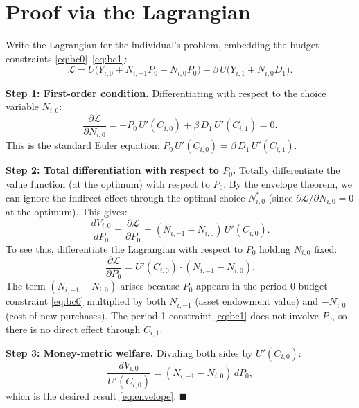 \documentclass[12pt]{article}
\begin{document}
\section{Proof via the Lagrangian}

Write the Lagrangian for the individual's problem, embedding the budget constraints \eqref{eq:bc0}--\eqref{eq:bc1}:
\begin{equation}
  \mathcal{L} = U\bigl(Y_{i,0} + N_{i,-1} P_0 - N_{i,0} P_0\bigr) + \beta \, U\bigl(Y_{i,1} + N_{i,0} D_1\bigr).
\end{equation}

\noindent \textbf{Step 1: First-order condition.} Differentiating with respect to the choice variable $N_{i,0}$:
\begin{equation} \label{eq:foc}
  \frac{\partial \mathcal{L}}{\partial N_{i,0}} = -P_0 \, U'(C_{i,0}) + \beta \, D_1 \, U'(C_{i,1}) = 0.
\end{equation}
This is the standard Euler equation: $P_0 \, U'(C_{i,0}) = \beta \, D_1 \, U'(C_{i,1})$.

\noindent \textbf{Step 2: Total differentiation with respect to $P_0$.} Totally differentiate the value function (at the optimum) with respect to $P_0$. By the envelope theorem, we can ignore the indirect effect through the optimal choice $N_{i,0}^*$ (since $\partial \mathcal{L}/\partial N_{i,0} = 0$ at the optimum). This gives:
\begin{equation}
  \frac{dV_{i,0}}{dP_0} = \frac{\partial \mathcal{L}}{\partial P_0} = (N_{i,-1} - N_{i,0}) \, U'(C_{i,0}).
\end{equation}
To see this, differentiate the Lagrangian with respect to $P_0$ holding $N_{i,0}$ fixed:
\begin{equation}
  \frac{\partial \mathcal{L}}{\partial P_0} = U'(C_{i,0}) \cdot (N_{i,-1} - N_{i,0}).
\end{equation}
The term $(N_{i,-1} - N_{i,0})$ arises because $P_0$ appears in the period-0 budget constraint \eqref{eq:bc0} multiplied by both $N_{i,-1}$ (asset endowment value) and $-N_{i,0}$ (cost of new purchases). The period-1 constraint \eqref{eq:bc1} does not involve $P_0$, so there is no direct effect through $C_{i,1}$.

\noindent \textbf{Step 3: Money-metric welfare.} Dividing both sides by $U'(C_{i,0})$:
\begin{equation}
  \frac{dV_{i,0}}{U'(C_{i,0})} = (N_{i,-1} - N_{i,0}) \, dP_0,
\end{equation}
which is the desired result \eqref{eq:envelope}. \hfill $\blacksquare$
\end{document}
